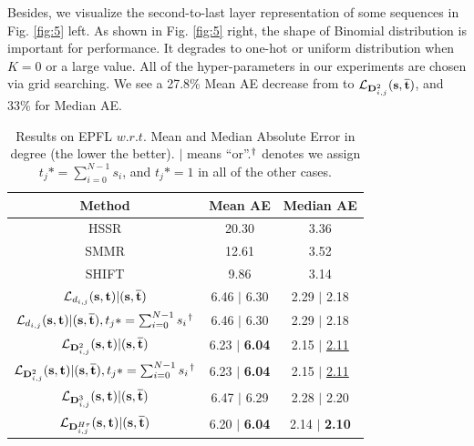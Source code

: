 Besides, we visualize the second-to-last layer representation of some sequences in Fig. \ref{fig:5} left. As shown in Fig. \ref{fig:5} right, the shape of Binomial distribution is important for performance. It degrades to one-hot or uniform distribution when $K=0$ or a large value. All of the hyper-parameters in our experiments are chosen via grid searching. We see a 27.8\% Mean AE decrease from \cite{hara2017designing} to $\small \mathcal{L}_{{\rm\textbf{D}}_{i,j}^2}{(\rm{{\textbf{s},\overline{\textbf{t}}}})}$, and 33\% for Median AE.  



\begin{table}  
\scriptsize
\renewcommand\arraystretch{1.2}
\label{tab:different_nets}
\begin{center}
\begin{tabular}{|c|c|c|}
\hline
Method&Mean AE&Median AE\\\hline\hline
  
HSSR\cite{yang2018hierarchical}&20.30&3.36\\\hline     
SMMR\cite{huang2017soft}&12.61&3.52\\\hline
SHIFT\cite{hara2017designing}&9.86&3.14\\\hline\hline
$\mathcal{L}_{d_{i,j}}{(\rm{{\textbf{s},{\textbf{t}}}})}|{(\rm{{\textbf{s},\overline{\textbf{t}}}})}$&6.46 $|$ 6.30&2.29 $|$ 2.18\\\hline  

$\mathcal{L}_{d_{i,j}}{(\rm{{\textbf{s},{\textbf{t}}}})}|{(\rm{{\textbf{s},\overline{\textbf{t}}}})},t_j*=\sum_{i=0}^{N-1}s_i$$^\text{\dag}$&6.46 $|$ 6.30&2.29 $|$ 2.18\\\hline  

$\mathcal{L}_{{\rm\textbf{D}}_{i,j}^2}{(\rm{{\textbf{s},{\textbf{t}}}})}|{(\rm{{\textbf{s},\overline{\textbf{t}}}})}$&6.23 $|$ \textbf{6.04}&2.15 $|$ \underline{2.11}\\\hline  

$\mathcal{L}_{{\rm\textbf{D}}_{i,j}^2}{(\rm{{\textbf{s},{\textbf{t}}}})}|{(\rm{{\textbf{s},\overline{\textbf{t}}}})},t_j*=\sum_{i=0}^{N-1}s_i$$^\text{\dag}$&6.23 $|$ \textbf{6.04}&2.15 $|$ \underline{2.11}\\\hline  

$\mathcal{L}_{{\rm\textbf{D}}_{i,j}^3}{(\rm{{\textbf{s},{\textbf{t}}}})}|{(\rm{{\textbf{s},\overline{\textbf{t}}}})}$&6.47 $|$ 6.29&2.28 $|$ 2.20\\\hline  


$\mathcal{L}_{{\rm\textbf{D}}_{i,j}^{H\tau}}{(\rm{{\textbf{s},{\textbf{t}}}})}|{(\rm{{\textbf{s},\overline{\textbf{t}}}})}$&6.20 $|$ \textbf{6.04}&2.14 $|$ \textbf{2.10}\\\hline    

\end{tabular}\label{tab:4}
\end{center}
\caption{Results on EPFL $w.r.t.$ Mean and Median Absolute Error in degree (the lower the better). $|$ means ``or''.$^\text{\dag}$ denotes we assign $t_j*=\sum_{i=0}^{N-1}s_i$, and $t_j*=1$ in all of the other cases.}
\end{table}



